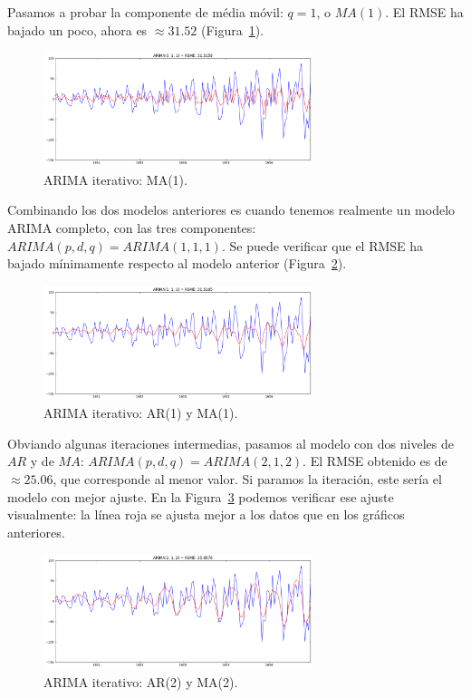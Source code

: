 \documentclass[11pt,spanish,listoffigures,listoftables]{tfgetsinf}
\begin{document}
    Pasamos a probar la componente de média móvil: \(q=1\), o \(MA(1)\). El RMSE ha bajado un poco, ahora es \(\approx31.52\) (Figura~\ref{fig:iterative_arima_ma_1}).
    
    \begin{figure}[h]
        \centering
        \includegraphics[width=0.7\textwidth]{arima_011.png}
        \caption{ARIMA iterativo: MA(1).}
        \label{fig:iterative_arima_ma_1}
    \end{figure}
    
    Combinando los dos modelos anteriores es cuando tenemos realmente un modelo ARIMA completo, con las tres componentes: \(ARIMA(p, d, q)=ARIMA(1, 1, 1)\). Se puede verificar que el RMSE ha bajado mínimamente respecto al modelo anterior (Figura~\ref{fig:iterative_arima_arma_1}).
    
    \begin{figure}[h]
        \centering
        \includegraphics[width=0.7\textwidth]{arima_111.png}
        \caption{ARIMA iterativo: AR(1) y MA(1).}
        \label{fig:iterative_arima_arma_1}
    \end{figure}
        
    Obviando algunas iteraciones intermedias, pasamos al modelo con dos niveles de \(AR\) y de \(MA\): \(ARIMA(p, d, q)=ARIMA(2, 1, 2)\). El RMSE obtenido es de \(\approx25.06\), que corresponde al menor valor. Si paramos la iteración, este sería el modelo con mejor ajuste. En la Figura~\ref{fig:iterative_arima_arma_2} podemos verificar ese ajuste visualmente: la línea roja se ajusta mejor a los datos que en los gráficos anteriores.
  
    \begin{figure}[h]
        \centering
        \includegraphics[width=0.7\textwidth]{arima_212.png}
        \caption{ARIMA iterativo: AR(2) y MA(2).}
        \label{fig:iterative_arima_arma_2}
    \end{figure}
    
\end{document}
